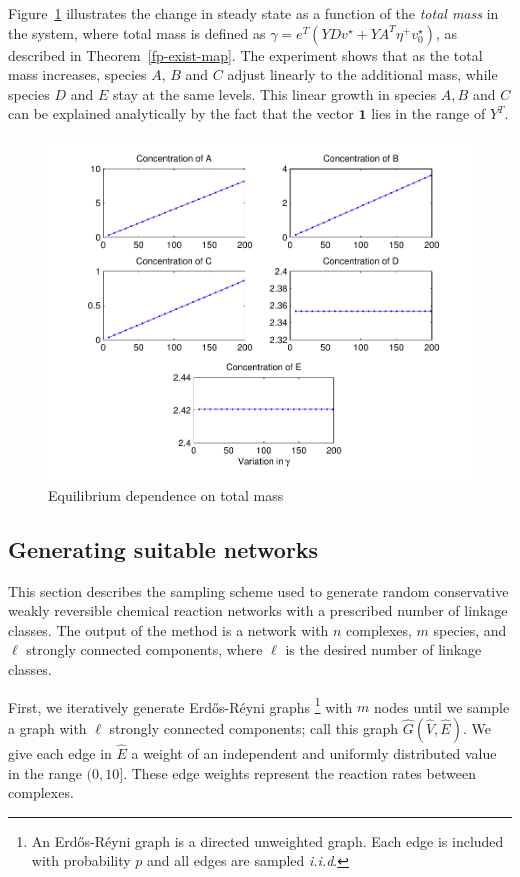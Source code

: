 \documentclass[smallextended]{svjour3}       %
\newcounter{sent}
\newcommand*{\0}{\mathbf{0}}
\newcommand*{\1}{\mathbf{1}}
\begin{document}
Figure~\ref{EquilibriumVsTotalMass} illustrates the change in steady state as a
function of the \emph{total mass} in the system, where total mass is defined as
$\gamma = e^T(YD v^\star + YA^T \eta^+ v^\star_0)$, as described in
Theorem~\ref{fp-exist-map}.  The experiment shows that as the total mass increases,
species $A$, $B$ and $C$ adjust linearly to the additional mass, while species
$D$ and $E$ stay at the same levels.  This linear growth in species $A, B$ and
$C$ can be explained analytically by the fact that the vector $\mathbf{1}$ lies
in the range of $Y^{T}$. 

\begin{figure}%
   \sidecaption
   \includegraphics[width=4.5in]{EquilibriumVsTotalMassExample}
   \caption{Equilibrium dependence on total mass} 
   \label{EquilibriumVsTotalMass}
\end{figure}

\subsection{Generating suitable networks}

This section describes the sampling scheme used to generate random conservative
weakly reversible chemical reaction networks with a prescribed number of
linkage classes.  The output of the method is a network with $n$
complexes, $m$ species, and $\ell$ strongly connected components, where $\ell$
is the desired number of linkage classes.

First, we iteratively generate Erd\H{o}s-R\'{e}yni graphs%
\footnote{An Erd\H{o}s-R\'{e}yni graph is a directed unweighted graph. Each
edge is included with probability $p$ and all edges are sampled \emph{i.i.d}.} %
with $m$ nodes until we sample a graph with $\ell$ strongly connected
components; call this graph $\hat G( \hat V, \hat E)$.  We give each edge in 
$\hat E$ a weight of an independent and uniformly distributed value in the
range $(0,10]$.  These edge weights represent the reaction rates between
complexes.
\end{document}
